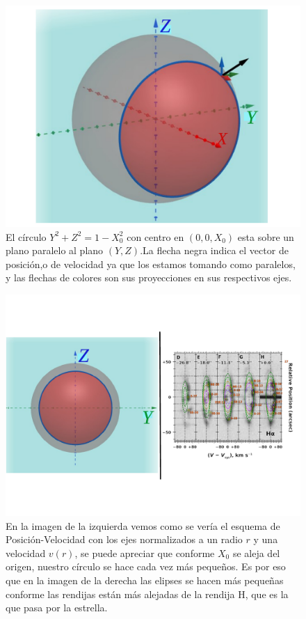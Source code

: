 \documentclass{book}
\begin{document}
\begin{figure}
    \centering
    \includegraphics[width=\textwidth]{imagenes_corregidas/PV 02.pdf}
    \caption{El círculo $Y^2+Z^2=1-X_0^2$ con centro en $(0,0,X_0)$ esta sobre un plano paralelo al plano $(Y,Z)$.La flecha negra indica el vector de posición,o de velocidad ya que los estamos tomando como paralelos, y las flechas de colores son sus proyecciones en sus respectivos ejes.}
    \label{fig:ap PV esfera3d}
\end{figure}


\begin{figure}
    \centering
    \includegraphics[width=\textwidth]{imagenes_corregidas/PV 03.pdf}
    \caption{En la imagen de la izquierda vemos como se vería el esquema de Posición-Velocidad con los ejes normalizados a un radio $r$ y una velocidad $v(r)$, se puede apreciar que conforme $X_0$ se aleja del origen, nuestro círculo se hace cada vez más pequeños. Es por eso que en la imagen de la derecha las elipses se hacen más pequeñas conforme las rendijas están más alejadas de la rendija H, que es la que pasa por la estrella. }
    \label{fig: ap PV modelo}
\end{figure}
\end{document}
